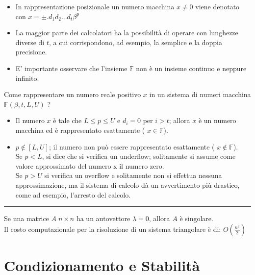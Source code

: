 \documentclass{article}
\newcommand\separationline{\noindent\rule{\textwidth}{0.4pt}} %
\begin{document}
		\begin{itemize}
			\item In rappresentazione posizionale un numero macchina $x \neq 0$ viene denotato con $x = \pm .d_1 d_2 ... d_t \beta ^p$
			\item La maggior parte dei calcolatori ha la possibilità di operare con lunghezze diverse di $t$, a cui corrispondono, ad esempio, la semplice e la doppia precisione.
			\item E' importante osservare che l'insieme $\mathbb{F}$ non è un insieme continuo e neppure infinito.
		\end{itemize}
		Come rappresentare un numero reale positivo $x$ in un sistema di numeri macchina $\mathbb{F} ( \beta, t, L, U)$ ?
		\begin{itemize}
			\item Il numero $x$ è tale che $L \leq p \leq U$ e $d_i = 0$ per $i > t$; allora $x$ è un numero macchina ed è rappresentato esattamente ({\color{blue} $x \in \mathbb{F}$}).
			\item $p \notin \left [ L, U \right ]$; il numero non può essere rappresentato esattamente ({\color{blue} $x \notin \mathbb{F}$}).
			\\Se $p < L$, si dice che si verifica un underflow; solitamente si assume come valore approssimato del numero x il numero zero.
			\\Se $p > U$ si verifica un overflow e solitamente non si effettua nessuna approssimazione, ma il sistema di calcolo dà un avvertimento più drastico, come ad esempio, l'arresto del calcolo.
		\end{itemize}

		\separationline

		Se una matrice $A \; n \times n$ ha un autovettore $\lambda = 0$, allora $A$ è singolare.\\
		Il costo computazionale per la risoluzione di un sistema triangolare è di: 
		$O ( \frac{n^2}{2} ) $

	\section{Condizionamento e Stabilità}
\end{document}
